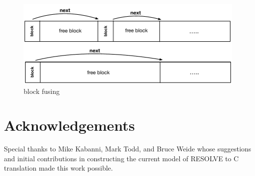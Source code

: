 \documentclass{sig-alternate}
\begin{document}
\begin{figure}[!htb]
\centering
\includegraphics[scale=.55]{figs/fuse.pdf}
\caption{block fusing}
\end{figure}
\label{fig:fuse}
 

\section{Acknowledgements}

Special thanks to Mike Kabanni, Mark Todd, and Bruce Weide whose suggestions and initial contributions in constructing the current model of RESOLVE to C translation made this work possible. 



\end{document}

